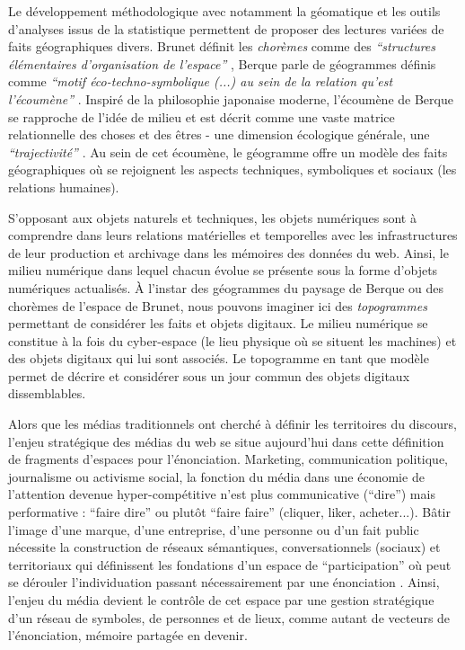 Le développement méthodologique avec notamment la géomatique et les outils d’analyses issus de la statistique permettent de proposer des lectures variées de faits géographiques divers. Brunet définit les \textit{chorèmes} comme des \textit{``structures élémentaires d'organisation de l'espace''} \citep{Brunet1980}, Berque parle de géogrammes définis comme \textit{``motif éco-techno-symbolique (...) au sein de la relation qu'est l'écoumène''} \citep{Berque1999}. Inspiré de la philosophie japonaise moderne, l’écoumène de Berque se rapproche de l’idée de milieu et est décrit comme une vaste matrice relationnelle des choses et des êtres - une dimension écologique générale, une \textit{``trajectivité''} \citep{Watsuji2011}. Au sein de cet écoumène, le géogramme offre un modèle des faits géographiques où se rejoignent les aspects techniques, symboliques et sociaux (les relations humaines). 

S’opposant aux objets naturels et techniques, les objets numériques sont à comprendre dans leurs relations matérielles et temporelles avec les infrastructures de leur production et archivage dans les mémoires des données du web. Ainsi, le milieu numérique dans lequel chacun évolue se présente sous la forme d’objets numériques actualisés. À l’instar des géogrammes du paysage de Berque ou des chorèmes de l’espace de Brunet, nous pouvons imaginer ici des \textit{topogrammes} permettant de considérer les faits et objets digitaux. Le milieu numérique se constitue à la fois du cyber-espace (le lieu physique où se situent les machines) et des objets digitaux qui lui sont associés. Le topogramme en tant que modèle permet de décrire et considérer sous un jour commun des objets digitaux dissemblables.

Alors que les médias traditionnels ont cherché à définir les territoires du discours, l’enjeu stratégique des médias du web se situe aujourd’hui dans cette définition de fragments d’espaces pour l’énonciation. Marketing, communication politique, journalisme ou activisme social, la fonction du média dans une économie de l’attention devenue hyper-compétitive \citep{Weng2012} n’est plus communicative (``dire'') mais performative : ``faire dire'' ou plutôt ``faire faire'' (cliquer, liker, acheter...). Bâtir l’image d’une marque, d’une entreprise, d’une personne ou d’un fait public nécessite la construction de réseaux sémantiques, conversationnels (sociaux) et territoriaux qui définissent les fondations d’un espace de ``participation'' où peut se dérouler l’individuation passant nécessairement par une énonciation \citep{Butler1993}. Ainsi, l’enjeu du média devient le contrôle de cet espace par une gestion stratégique d’un réseau de symboles, de personnes et de lieux, comme autant de vecteurs de l’énonciation, mémoire partagée en devenir. 

